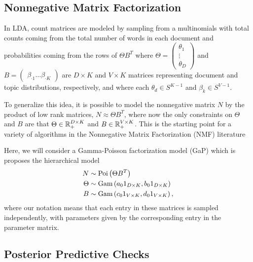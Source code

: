 \documentclass[oupdraft]{bio}
\begin{document}
\subsection{Nonnegative Matrix Factorization}
\label{sec:nmf}

In LDA, count matrices are modeled by sampling from a multinomials with total
counts coming from the total number of words in each document and probabilities
coming from the rows of $\Theta B^{T}$ where $\Theta = \begin{pmatrix}\theta_{1}
  \\ \vdots \\ \theta_{D} \end{pmatrix}$ and $B = \begin{pmatrix} \beta_{\cdot 1}
  \dots \beta_{\cdot K} \end{pmatrix}$ are $D \times K$ and $V \times K$ matrices
representing document and topic distributions, respectively, and where each
$\theta_{d} \in S^{K - 1}$ and $\beta_{k} \in S^{V - 1}$.


To generalize this idea, it is possible to model the nonnegative matrix $N$
by the product of low rank matrices, $N \approx \Theta B^{T}$, where now the
only constraints on $\Theta$ and $B$ are that $\Theta \in \mathbb{R}_{+}^{D \times
  K}$ and $B \in \mathbb{R}_{+}^{V \times K}$. This is the starting point for a
variety of algorithms in the Nonnegative Matrix Factorization (NMF) literature
\citep{wang2013nonnegative, berry2007algorithms, lee2001algorithms}

Here, we will consider a Gamma-Poisson factorization model (GaP)
\citep{kucukelbir2015automatic, canny2004gap} which is proposes the hierarchical
model
\begin{align*}
N &\sim \textnormal{Poi}\left(\Theta B^{T}\right) \\
\Theta &\sim \textnormal{Gam}\left(a_{0} 1_{D \times K}, b_{0} 1_{D \times K}\right) \\
B &\sim \textnormal{Gam}\left(c_{0} 1_{V \times K}, d_{0} 1_{V \times K} \right),
\end{align*}
where our notation means that each entry in these matrices is sampled
independently, with parameters given by the corresponding entry in the parameter
matrix.

\subsection{Posterior Predictive Checks}
\label{sec:ppc_overview}
\end{document}
